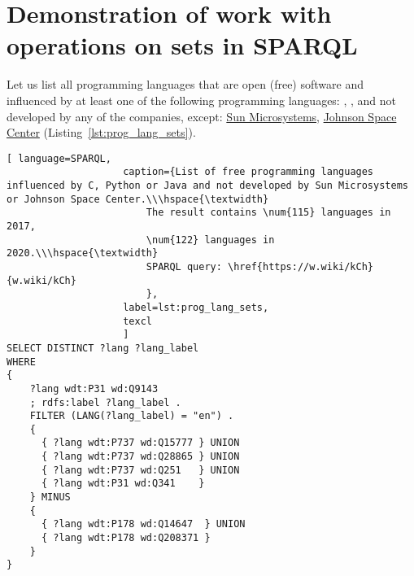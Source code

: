 \label{question:prog_lang_1}

\section{Demonstration of work with operations on sets in SPARQL}

Let us list all programming languages that are open (free) software and influenced by at least one of the following programming languages: , ,  and not developed by any of the companies, except: \href{https://en.wikipedia.org/wiki/Sun_Microsystems}{Sun Microsystems}, \href{https://en.wikipedia.org/wiki/Johnson_Space_Center}{Johnson Space Center} (Listing~\ref{lst:prog_lang_sets}).
\begin{lstlisting}[ language=SPARQL, 
                    caption={List of free programming languages influenced by C, Python or Java and not developed by Sun Microsystems or Johnson Space Center.\\\hspace{\textwidth}
                        The result contains \num{115} languages in 2017, 
                        \num{122} languages in 2020.\\\hspace{\textwidth}
                        SPARQL query: \href{https://w.wiki/kCh}{w.wiki/kCh}
                        },
                    label=lst:prog_lang_sets,
                    texcl 
                    ]
SELECT DISTINCT ?lang ?lang_label
WHERE
{
    ?lang wdt:P31 wd:Q9143
    ; rdfs:label ?lang_label . 
    FILTER (LANG(?lang_label) = "en") . 
    {
      { ?lang wdt:P737 wd:Q15777 } UNION
      { ?lang wdt:P737 wd:Q28865 } UNION 
      { ?lang wdt:P737 wd:Q251   } UNION
      { ?lang wdt:P31 wd:Q341    }
    } MINUS 
  	{ 
      { ?lang wdt:P178 wd:Q14647  } UNION
      { ?lang wdt:P178 wd:Q208371 }
    }   
}
\end{lstlisting}%

